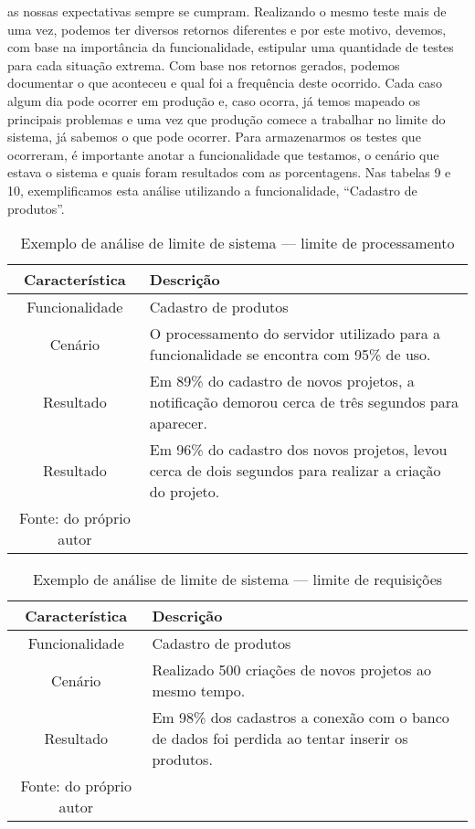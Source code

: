       as nossas expectativas sempre se cumpram. Realizando o mesmo teste mais de
      uma vez, podemos ter diversos retornos diferentes e por este motivo, devemos,
      com base na importância da funcionalidade, estipular uma quantidade de testes
      para cada situação extrema. Com base nos retornos gerados, podemos documentar
      o que aconteceu e qual foi a frequência deste ocorrido. Cada caso algum dia
      pode ocorrer em produção e, caso ocorra, já temos mapeado os principais
      problemas e uma vez que produção comece a trabalhar no limite do sistema,
      já sabemos o que pode ocorrer. Para armazenarmos os testes que ocorreram,
      é importante anotar a funcionalidade que testamos, o cenário que estava o
      sistema e quais foram resultados com as porcentagens. Nas tabelas 9 e 10,
      exemplificamos esta análise utilizando a funcionalidade, “Cadastro de produtos”.

      \begin{table}[h!]
        \centering
        \label{Tabela:9}
        \caption{Exemplo de análise de limite de sistema — limite de processamento}
        \begin{tabular}{c p{9cm}}
          \hline
          \textbf{Característica} &
          \textbf{Descrição} \\
          \hline
          Funcionalidade &
          Cadastro de produtos \\
          Cenário &
          O processamento do servidor utilizado para a funcionalidade se encontra
          com 95\% de uso. \\
          Resultado &
          Em 89\% do cadastro de novos projetos, a notificação demorou cerca de
          três segundos para aparecer. \\
          Resultado &
          Em 96\% do cadastro dos novos projetos, levou cerca de dois
          segundos para realizar a criação do projeto. \\ \hline
          \newline
          \small{Fonte: do próprio autor}
        \end{tabular}
      \end{table}

      \begin{table}[h!]
        \centering
        \label{Tabela:10}
        \caption{Exemplo de análise de limite de sistema — limite de requisições}
        \begin{tabular}{c p{9cm}}
          \hline
          \textbf{Característica} &
          \textbf{Descrição} \\
          \hline
          Funcionalidade &
          Cadastro de produtos \\
          Cenário &
          Realizado 500 criações de novos projetos ao mesmo tempo. \\
          Resultado &
          Em 98\% dos cadastros a conexão com o banco de dados foi perdida ao tentar
          inserir os produtos. \\ \hline
          \newline
          \small{Fonte: do próprio autor}
        \end{tabular}
      \end{table}

